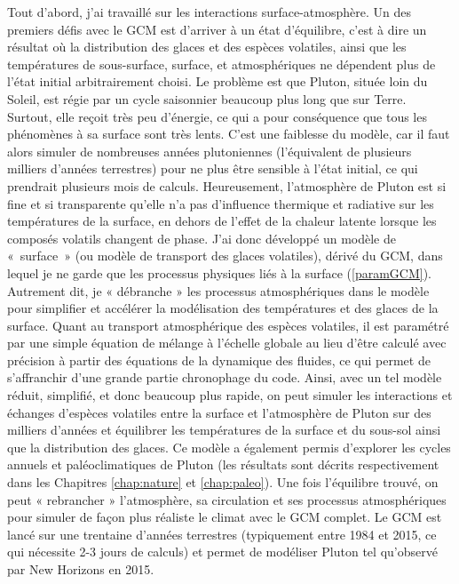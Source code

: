 \vspace{0.5cm}

Tout d’abord, j’ai travaillé sur les interactions surface-atmosphère. Un des premiers défis avec le GCM est d’arriver à un état d'équilibre, c'est à dire un résultat où la distribution des glaces et des espèces volatiles, ainsi que les températures de sous-surface, surface, et atmosphériques ne dépendent plus de l'état initial arbitrairement choisi. Le problème est que Pluton, située loin du Soleil, est régie par un cycle saisonnier beaucoup plus long que sur Terre. Surtout, elle reçoit très peu d'énergie, ce qui a pour conséquence que tous les phénomènes à sa surface sont très lents. C’est une faiblesse du modèle, car il faut alors simuler de nombreuses années plutoniennes (l'équivalent de plusieurs milliers d'années terrestres) pour ne plus être sensible à l'état initial, ce qui prendrait plusieurs mois de calculs. 
Heureusement, l'atmosphère de Pluton est si fine et si transparente qu'elle n'a pas d'influence thermique et radiative sur les températures de la surface, en dehors de l'effet de la chaleur latente lorsque les composés volatils changent de phase. 
J’ai donc développé un modèle de «~surface~» (ou modèle de transport des glaces volatiles), dérivé du GCM, dans lequel je ne garde que les processus physiques liés à la surface (\autoref{paramGCM}). Autrement dit, je « débranche » les processus atmosphériques dans le modèle pour simplifier et accélérer la modélisation des températures et des glaces de la surface. Quant au transport atmosphérique des espèces volatiles, il est paramétré par une simple équation de mélange à l'échelle globale au lieu d’être calculé avec précision à partir des équations de la dynamique des fluides, ce qui permet de s’affranchir d’une grande partie chronophage du code. Ainsi, avec un tel modèle réduit, simplifié, et donc beaucoup plus rapide, on peut simuler les interactions et échanges d'espèces volatiles entre la surface et l’atmosphère de Pluton sur des milliers d'années et équilibrer les températures de la surface et du sous-sol ainsi que la distribution des glaces. Ce modèle a également permis d’explorer les cycles annuels et paléoclimatiques de Pluton (les résultats sont décrits respectivement dans les Chapitres \ref{chap:nature} et \ref{chap:paleo}). Une fois l'équilibre trouvé, on peut « rebrancher » l'atmosphère, sa circulation et ses processus atmosphériques pour simuler de façon plus réaliste le climat avec le GCM complet. Le GCM est lancé sur une trentaine d'années terrestres (typiquement entre 1984 et 2015, ce qui nécessite 2-3 jours de calculs) et permet de modéliser Pluton tel qu’observé par New Horizons en 2015. 

